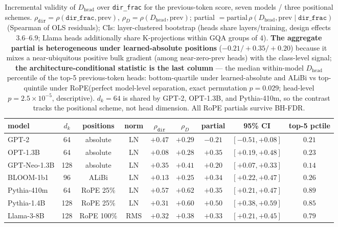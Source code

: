 \documentclass[11pt]{article}
\newcommand{\dirfrac}{\texttt{dir\_frac}\xspace}
\newcommand{\Dhead}{\ensuremath{D_{\text{head}}}\xspace}
\newcommand{\Rope}{RoPE\xspace}
\begin{document}
\begin{table}[t]\centering\footnotesize\setlength{\tabcolsep}{3.5pt}
\begin{tabular}{lcccccccc}\toprule
model & $d_k$ & positions & norm & $\rho_{\texttt{dir}}$ & $\rho_{D}$ & partial & 95\% CI & \textbf{top-5 pctile}\\\midrule
GPT-2        & 64  & absolute   & LN  & $+0.47$ & $+0.29$ & $-0.21$ & $[-0.51,+0.08]$ & $\mathbf{0.21}$\\
OPT-1.3B     & 64  & absolute   & LN  & $+0.08$ & $+0.28$ & $+0.35$ & $[+0.19,+0.48]$ & $\mathbf{0.23}$\\
GPT-Neo-1.3B & 128 & absolute   & LN  & $+0.35$ & $+0.41$ & $+0.20$ & $[+0.07,+0.33]$ & $\mathbf{0.14}$\\
BLOOM-1b1    & 96  & ALiBi      & LN  & $+0.13$ & $+0.25$ & $+0.34$ & $[+0.22,+0.47]$ & $\mathbf{0.26}$\\
Pythia-410m  & 64  & \Rope 25\% & LN  & $+0.57$ & $+0.62$ & $+0.35$ & $[+0.21,+0.47]$ & $\mathbf{0.89}$\\
Pythia-1.4B  & 128 & \Rope 25\% & LN  & $+0.31$ & $+0.60$ & $+0.50$ & $[+0.38,+0.59]$ & $\mathbf{0.85}$\\
Llama-3-8B   & 128 & \Rope 100\%& RMS & $+0.32$ & $+0.38$ & $+0.33$ & $[+0.21,+0.45]$ & $\mathbf{0.79}$\\
\bottomrule\end{tabular}
\caption{Incremental validity of \Dhead over \dirfrac for the previous-token score, seven models / three
positional schemes. $\rho_{\texttt{dir}}=\rho(\dirfrac,\text{prev})$, $\rho_D=\rho(\Dhead,\text{prev})$; partial $=
\mathrm{partial}\,\rho(\Dhead,\text{prev}\mid\dirfrac)$ (Spearman of OLS residuals); CIs: layer-clustered bootstrap
(heads share layers/training, design effects $3.6$--$6.9$; Llama heads additionally share K-projections within GQA
groups of 4). \textbf{The aggregate partial is heterogeneous under learned-absolute positions} ($-0.21/+0.35/+0.20$)
because it mixes a near-ubiquitous positive bulk gradient (among near-zero-prev heads) with the class-level signal;
\textbf{the architecture-conditional statistic is the last column} --- the median within-model \Dhead percentile of
the top-5 previous-token heads: bottom-quartile under learned-absolute and ALiBi vs top-quintile under \Rope (perfect model-level separation,
exact permutation $p{=}0.029$; head-level $p{=}2.5{\times}10^{-5}$, descriptive). $d_k{=}64$ is shared by GPT-2, OPT-1.3B, and Pythia-410m, so the contrast
tracks the positional scheme, not head dimension. All \Rope partials survive BH-FDR.}
\label{tab:reversal}
\end{table}
\end{document}
